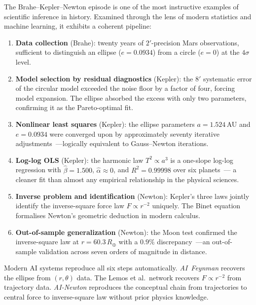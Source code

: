 \documentclass[12pt]{article}
\begin{document}
The Brahe--Kepler--Newton episode is one of the most instructive examples
of scientific inference in history.
Examined through the lens of modern statistics and machine learning,
it exhibits a coherent pipeline:

\begin{enumerate}
  \item \textbf{Data collection} (Brahe): twenty years of $2'$-precision
        Mars observations, sufficient to distinguish an ellipse
        ($e=0.0934$) from a circle ($e=0$) at the $4\sigma$ level.

  \item \textbf{Model selection by residual diagnostics} (Kepler):
        the $8'$ systematic error of the circular model exceeded the
        noise floor by a factor of four, forcing model expansion.
        The ellipse absorbed the excess with only two parameters,
        confirming it as the Pareto-optimal fit.

  \item \textbf{Nonlinear least squares} (Kepler): the ellipse parameters
        $a=1.524$\,AU and $e=0.0934$ were converged upon by approximately
        seventy iterative adjustments~---logically equivalent to
        Gauss--Newton iterations.

  \item \textbf{Log-log OLS} (Kepler): the harmonic law $T^{2}\propto a^{3}$
        is a one-slope log-log regression with $\hat\beta=1.500$,
        $\hat\alpha\approx0$, and $R^{2}=0.99998$ over six planets~---
        a cleaner fit than almost any empirical relationship in the
        physical sciences.

  \item \textbf{Inverse problem and identification} (Newton):
        Kepler's three laws jointly identify the inverse-square force law
        $F\propto r^{-2}$ uniquely.  The Binet equation formalises
        Newton's geometric deduction in modern calculus.

  \item \textbf{Out-of-sample generalization} (Newton): the Moon test
        confirmed the inverse-square law at $r=60.3\,R_\oplus$ with
        a $0.9\%$ discrepancy~---an out-of-sample validation across seven
        orders of magnitude in distance.
\end{enumerate}

Modern AI systems reproduce all six steps automatically.
\textit{AI~Feynman} recovers the ellipse from $(r,\theta)$ data.
The Lemos et al.\ network recovers $F\propto r^{-2}$ from trajectory data.
\textit{AI-Newton} reproduces the conceptual chain from trajectories to
central force to inverse-square law without prior physics knowledge.
\end{document}
